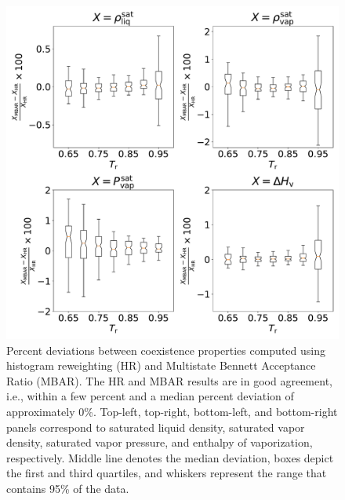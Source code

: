 \documentclass[journal=jced,manuscript=article]{achemso}
\begin{document}
	\begin{figure}[htb!]
		\centering
		\includegraphics[width=6.4in]{Comparison_MBAR_HR_boxplot_CI.pdf}
		\caption{Percent deviations between coexistence properties computed using histogram reweighting (HR) and Multistate Bennett Acceptance Ratio (MBAR). The HR and MBAR results are in good agreement, i.e., within a few percent and a median percent deviation of approximately 0\%. Top-left, top-right, bottom-left, and bottom-right panels correspond to saturated liquid density, saturated vapor density, saturated vapor pressure, and enthalpy of vaporization, respectively. Middle line denotes the median deviation, boxes depict the first and third quartiles, and whiskers represent the range that contains 95\% of the data.}
		\label{fig:comparison MBAR HR}
	\end{figure}


\end{document}
